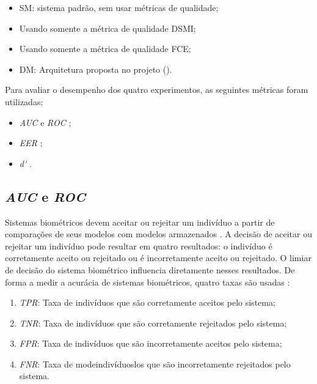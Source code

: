 \begin{itemize}
    \item \acrfull{SM}: sistema padrão, sem usar métricas de qualidade;
    \item Usando somente a métrica de qualidade DSMI;
    \item Usando somente a métrica de qualidade FCE;
    \item \acrfull{DM}: Arquitetura proposta no projeto ().
\end{itemize}

\par Para avaliar o desempenho dos quatro experimentos, as seguintes métricas foram utilizadas:

\begin{itemize}
    \item \textit{\acrfull{AUC}} e \textit{\acrfull{ROC}} \cite{d33BEAT, aucROC, daugman2000};
    \item \textit{\acrfull{EER}} \cite{eer,d33BEAT};
    \item \textit{\acrfull{d'}} \cite{daugman2000}.
\end{itemize}

\subsection{\textit{\acrfull{AUC}} e \textit{\acrfull{ROC}}}\label{sec:experimentos:auc}

\par Sistemas biométricos devem aceitar ou rejeitar um indivíduo a partir de comparações de seus modelos com modelos armazenados \cite{wayman2005biometric}. A decisão de aceitar ou rejeitar um indivíduo pode resultar em quatro resultados: o indivíduo é corretamente aceito ou rejeitado ou é incorretamente aceito ou rejeitado. O limiar de decisão do sistema biométrico influencia diretamente nesses resultados. De forma a medir a acurácia de sistemas biométricos, quatro taxas são usadas \cite{daugman2000}:

\begin{enumerate}
    \item \textit{\acrfull{TPR}}: Taxa de indivíduos que são corretamente aceitos pelo sistema;
    \item \textit{\acrfull{TNR}}: Taxa de indivíduos que são corretamente rejeitados pelo sistema;
    \item \textit{\acrfull{FPR}}: Taxa de indivíduos que são incorretamente aceitos pelo sistema;
    \item \textit{\acrfull{FNR}}: Taxa de modeindivíduoslos que são incorretamente rejeitados pelo sistema.
\end{enumerate}


